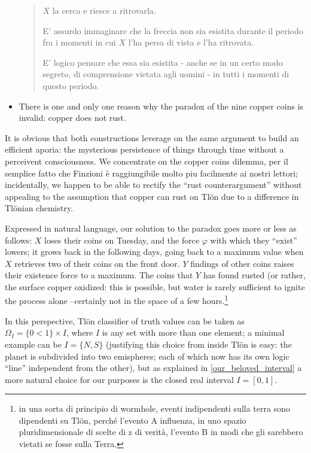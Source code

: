 \begin{example}
\begin{itemize}
\begin{quote}
			      $X$ la cerca e riesce a ritrovarla.

			      E' assurdo immaginare che la freccia non sia esistita durante il periodo fra i momenti in cui $X$ l'ha persa di vista e l'ha ritrovata.

			      E' logico pensare che essa sia esistita - anche se in un certo modo segreto, di comprensione vietata agli uomini - in tutti i momenti di questo periodo.
		      \end{quote}
		\item There is one and only one reason why the paradox of the nine copper coins is invalid: copper does not rust.
	\end{itemize}
	It is obvious that both constructions leverage on the same argument to build an efficient aporia: the mysterious persistence of things through time without a perceivent consciousness. We concentrate on the copper coins dilemma, per il semplice fatto che Finzioni è raggiungibile molto piu facilmente ai nostri lettori; incidentally, we happen to be able to rectify the ``rust counterargument'' without appealing to the assumption that copper can rust on Tl\"on due to a difference in Tl\"onian chemistry.

	Expressed in natural language, our solution to the paradox goes more or less as follows: $X$ loses their coins on Tuesday, and the force $\varphi$ with which they ``exist'' lowers; it grows back in the following days, going back to a maximum value when $X$ retrieves two of their coins on the front door. $Y$ findings of other coins raises their existence force to a maximum. The coins that $Y$ has found rusted (or rather, the surface copper oxidized: this is possible, but water is rarely sufficient to ignite the process alone --certainly not in the space of a few hours.\footnote{in una sorta di principio di wormhole, eventi indipendenti sulla terra sono dipendenti su Tlön, perché l'evento A influenza, in uno spazio pluridimensionale di scelte di z di verità, l'evento B in modi che gli sarebbero vietati se fosse sulla Terra.}
\begin{remark}\label{our_beloved_interval}
	In this perspective, Tl\"on classifier of truth values can be taken as $\Omega_I = \{0<1\}\times I$, where $I$ is any set with more than one element; a minimal example can be $I=\{N,S\}$ (justifying this choice from inside Tl\"on is easy: the planet is subdivided into two emispheres; each of which now has its own logic ``line'' independent from the other), but as explained in \autoref{our_beloved_interval} a more natural choice for our purposes is the closed real interval $I=[0,1]$.


\end{remark}
\end{example}
